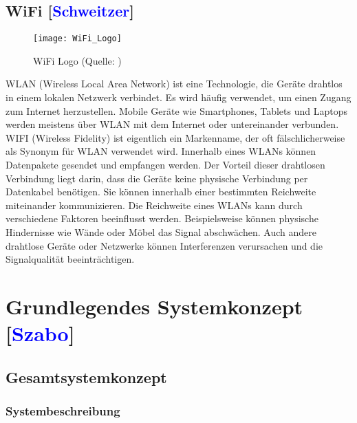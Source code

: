 \documentclass[titlepage,12pt,twoside]{article}
\begin{document}
\subsection{WiFi [\textcolor{blue}{Schweitzer}]}
\label{chap:WiFi}
\begin{figure}[H]
	\begin{center}
		\scalebox{0.5}
		{\texttt{[image: WiFi\_Logo]}}
		\caption{WiFi Logo (Quelle: \textcolor{blue}{\cite{WIFIabbildung}})}
		\label{fig:WiFi_Logo}
	\end{center}
\end{figure}
\hfill \break
WLAN (Wireless Local Area Network) ist eine Technologie, die Geräte drahtlos in einem lokalen Netzwerk verbindet. Es wird häufig verwendet, um einen Zugang zum Internet herzustellen. Mobile Geräte wie Smartphones, Tablets und Laptops werden meistens über WLAN mit dem Internet oder untereinander verbunden.
WIFI (Wireless Fidelity) ist eigentlich ein Markenname, der oft fälschlicherweise als Synonym für WLAN verwendet wird. 
Innerhalb eines WLANs können Datenpakete gesendet und empfangen werden. Der Vorteil dieser drahtlosen Verbindung liegt darin, dass die Geräte keine physische Verbindung per Datenkabel benötigen. Sie können innerhalb einer bestimmten Reichweite miteinander kommunizieren.
Die Reichweite eines WLANs kann durch verschiedene Faktoren beeinflusst werden. Beispielsweise können physische Hindernisse wie Wände oder Möbel das Signal abschwächen. Auch andere drahtlose Geräte oder Netzwerke können Interferenzen verursachen und die Signalqualität beeinträchtigen. \\

\newpage

\section{Grundlegendes Systemkonzept [\textcolor{blue}{Szabo}]}
\label{chap:Grundlegende Systemkonzepte}

\subsection{Gesamtsystemkonzept}
\label{chap:Gesamtsystemkonzept}

\subsubsection{Systembeschreibung}
\end{document}

